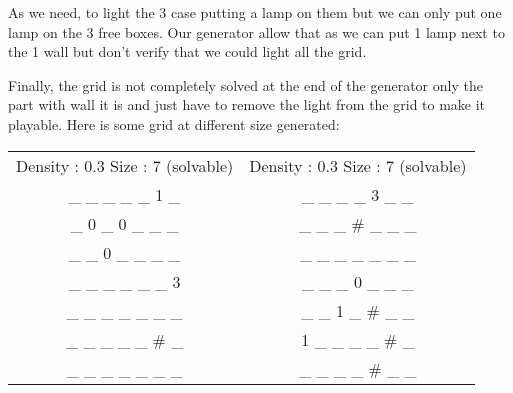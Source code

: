 \documentclass[a4paper]{article}
\begin{document}
As we need, to light the 3 case putting a lamp on them but we can only put one lamp on the 3 free boxes. Our generator allow that as we can put 1 lamp next to the 1 wall but don't verify that we could light all the grid.

Finally, the grid is not completely solved at the end of the generator only the part with wall it is and just have to remove the light from the grid to make it playable. 
Here is some grid at different size generated: 
\newline

\begin{tabular}{c c}


Density : 0.3 Size : 7 (solvable)& Density : 0.3 Size : 7 (solvable)  \\
\_ \_ \_ \_ \_  1 \_			& \_ \_ \_ \_ 3 \_ \_ 		\\
\_  0 \_  0 \_ \_ \_			& \_ \_ \_ \# \_ \_ \_		\\
\_ \_  0 \_ \_ \_ \_			& \_ \_ \_ \_ \_ \_ \_		\\
\_ \_ \_ \_ \_ \_  3			& \_ \_ \_  0 \_ \_ \_		\\
\_ \_ \_ \_ \_ \_ \_			& \_ \_  1 \_ \# \_ \_		\\
\_ \_ \_ \_ \_ \# \_			&  1 \_ \_ \_ \_ \# \_		\\
\_ \_ \_ \_ \_ \_ \_			& \_ \_ \_ \_ \# \_ \_		\\



\end{tabular}
\end{document}
